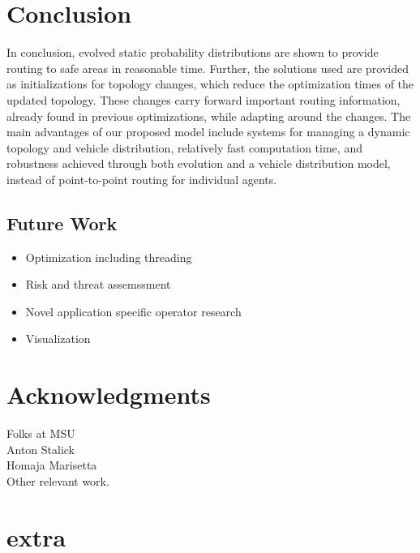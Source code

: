 \documentclass{sig-alternate-05-2015}
\begin{document}
	\section{Conclusion}
		In conclusion, evolved static probability distributions are shown to provide routing to safe areas in reasonable time. Further, the solutions used are provided as initializations for topology changes, which reduce the optimization times of the updated topology. These changes carry forward important routing information, already found in previous optimizations, while adapting around the changes. The main advantages of our proposed model include systems for managing a dynamic topology and vehicle distribution, relatively fast computation time, and robustness achieved through both evolution and a vehicle distribution model, instead of point-to-point routing for individual agents.
		
		\subsection{Future Work}
		\begin{itemize}
			\item Optimization including threading
			\item Risk and threat assemssment
			\item Novel application specific operator research
			\item Visualization
			
		\end{itemize}
		
	\section{Acknowledgments}
	Folks at MSU\\
	Anton Stalick\\
	Homaja Marisetta\\
	Other relevant work.
	
	
	
	
	\section{extra}
\end{document}
